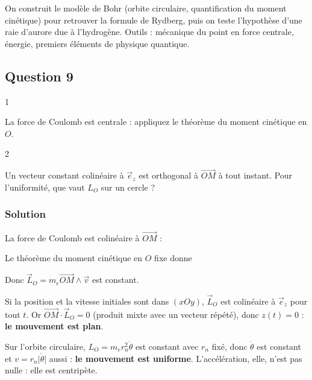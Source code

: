 \documentclass[11pt,a4paper]{article}
\newcommand{\equationajustee}[1]{%
  \sbox{\boiteequation}{$\displaystyle #1$}%
  \ifdim\wd\boiteequation>\linewidth
    \[\resizebox{\linewidth}{!}{\usebox{\boiteequation}}\]%
  \else
    \[#1\]%
  \fi}
\begin{document}
On construit le modèle de Bohr (orbite circulaire, quantification du moment cinétique) pour retrouver la formule de Rydberg, puis on teste l'hypothèse d'une raie d'aurore due à l'hydrogène. Outils : mécanique du point en force centrale, énergie, premiers éléments de physique quantique.

\hypertarget{question-9}{%
\subsection{Question 9}\label{question-9}}

\begin{indication}{1}

La force de Coulomb est centrale : appliquez le théorème du moment cinétique en \(O\).

\end{indication}

\begin{indication}{2}

Un vecteur constant colinéaire à \(\vec e_z\) est orthogonal à \(\overrightarrow{OM}\) à tout instant. Pour l'uniformité, que vaut \(L_O\) sur un cercle ?

\end{indication}

\hypertarget{solution-8}{%
\subsubsection{Solution}\label{solution-8}}

La force de Coulomb est colinéaire à \(\overrightarrow{OM}\) :

\equationajustee{\vec F=-\frac{e^2}{4\pi\varepsilon_0r^2}\vec e_r.}

Le théorème du moment cinétique en \(O\) fixe donne

\equationajustee{\frac{\mathrm d\vec L_O}{\mathrm dt}=\overrightarrow{OM}\wedge\vec F=\vec 0.}

Donc \(\vec L_O=m_e\overrightarrow{OM}\wedge\vec v\) est constant.

Si la position et la vitesse initiales sont dans \((xOy)\), \(\vec L_O\) est colinéaire à \(\vec e_z\) pour tout \(t\). Or \(\overrightarrow{OM}\cdot\vec L_O=0\) (produit mixte avec un vecteur répété), donc \(z(t)=0\) : \textbf{le mouvement est plan}.

Sur l'orbite circulaire, \(L_O=m_er_n^2\dot\theta\) est constant avec \(r_n\) fixé, donc \(\dot\theta\) est constant et \(v=r_n\lvert\dot\theta\rvert\) aussi : \textbf{le mouvement est uniforme}. L'accélération, elle, n'est pas nulle : elle est centripète.
\end{document}
